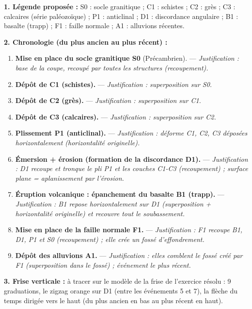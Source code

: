 \documentclass[11pt]{article}
\begin{document}
\begin{corrige}
\textbf{1. Légende proposée :} S0 : socle granitique ; C1 : schistes ; C2 : grès ; C3 : calcaires (série paléozoïque) ; P1 : anticlinal ; D1 : discordance angulaire ; B1 : basalte (trapp) ; F1 : faille normale ; A1 : alluvions récentes.

\textbf{2. Chronologie (du plus ancien au plus récent) :}
\begin{enumerate}
    \item \textbf{Mise en place du socle granitique S0} (Précambrien). — \textit{Justification : base de la coupe, recoupé par toutes les structures (recoupement).}
    \item \textbf{Dépôt de C1 (schistes).} — \textit{Justification : superposition sur S0.}
    \item \textbf{Dépôt de C2 (grès).} — \textit{Justification : superposition sur C1.}
    \item \textbf{Dépôt de C3 (calcaires).} — \textit{Justification : superposition sur C2.}
    \item \textbf{Plissement P1 (anticlinal).} — \textit{Justification : déforme C1, C2, C3 déposées horizontalement (horizontalité originelle).}
    \item \textbf{Émersion + érosion (formation de la discordance D1).} — \textit{Justification : D1 recoupe et tronque le pli P1 et les couches C1-C3 (recoupement) ; surface plane = aplanissement par l'érosion.}
    \item \textbf{Éruption volcanique : épanchement du basalte B1 (trapp).} — \textit{Justification : B1 repose horizontalement sur D1 (superposition + horizontalité originelle) et recouvre tout le soubassement.}
    \item \textbf{Mise en place de la faille normale F1.} — \textit{Justification : F1 recoupe B1, D1, P1 et S0 (recoupement) ; elle crée un fossé d'effondrement.}
    \item \textbf{Dépôt des alluvions A1.} — \textit{Justification : elles comblent le fossé créé par F1 (superposition dans le fossé) ; événement le plus récent.}
\end{enumerate}

\textbf{3. Frise verticale :} à tracer sur le modèle de la frise de l'exercice résolu : 9 graduations, le zigzag orange sur D1 (entre les événements 5 et 7), la flèche du temps dirigée vers le haut (du plus ancien en bas au plus récent en haut).
\end{corrige}
\end{document}
